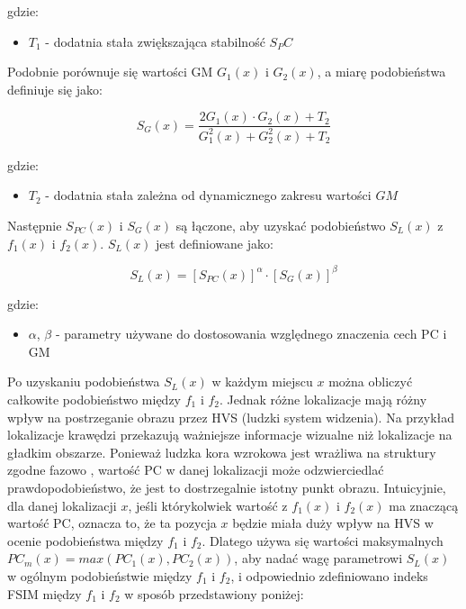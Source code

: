 \documentclass{article}
\begin{document}
gdzie:
\begin{itemize}[label=]
  \item $T_1$ - dodatnia stała zwiększająca stabilność $S_PC$
\end{itemize}

Podobnie porównuje się wartości GM $G_1(x)$ i $G_2(x)$, a miarę podobieństwa definiuje się jako:

\begin{equation}
  S_G(x) = \frac{2G_1(x) \cdot G_2(x) + T_2}{G^2_1(x) + G^2_2(x) + T_2}
\end{equation}

gdzie:
\begin{itemize}[label=]
  \item $T_2$ - dodatnia stała zależna od dynamicznego zakresu wartości $GM$
\end{itemize}

Następnie $S_{PC}(x)$ i $S_G(x)$ są łączone, aby uzyskać podobieństwo $S_L(x)$ z $f_1(x)$ i $f_2(x)$. $S_L(x)$ jest definiowane jako:

\begin{equation}
  S_L(x) = [S_{PC}(x)]^\alpha \cdot [S_G(x)]^\beta
\end{equation}

gdzie:
\begin{itemize}[label=]
  \item $\alpha$, $\beta$ - parametry używane do dostosowania względnego znaczenia cech PC i GM
\end{itemize}

Po uzyskaniu podobieństwa $S_L(x)$ w każdym miejscu $x$ można obliczyć całkowite podobieństwo między $f_1$ i $f_2$. 
Jednak różne lokalizacje mają różny wpływ na postrzeganie obrazu przez HVS (ludzki system widzenia). 
Na przykład lokalizacje krawędzi przekazują ważniejsze informacje wizualne niż lokalizacje na gładkim obszarze. 
Ponieważ ludzka kora wzrokowa jest wrażliwa na struktury zgodne fazowo \cite{kora_wzrokowa}, wartość PC w danej 
lokalizacji może odzwierciedlać prawdopodobieństwo, że jest to dostrzegalnie istotny punkt obrazu. 
Intuicyjnie, dla danej lokalizacji $x$, jeśli którykolwiek wartość z $f_1(x)$ i $f_2(x)$ ma znaczącą wartość PC, 
oznacza to, że ta pozycja $x$ będzie miała duży wpływ na HVS w ocenie podobieństwa między $f_1$ i $f_2$. 
Dlatego używa się wartości maksymalnych $PC_m(x) = max (PC_1(x), PC_2(x))$, aby nadać wagę parametrowi $S_L(x)$ w 
ogólnym podobieństwie między $f_1$ i $f_2$, i odpowiednio zdefiniowano indeks FSIM między $f_1$ i $f_2$ w sposób przedstawiony poniżej:
\end{document}
